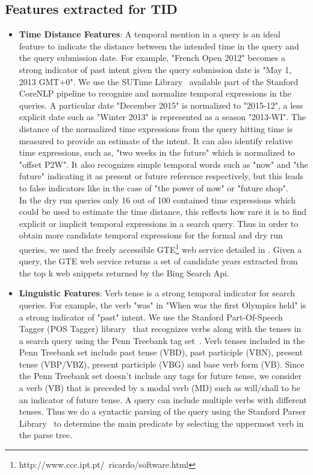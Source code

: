 \documentclass{sig-alternate}
\begin{document}
\subsection{Features extracted for TID}
\begin{itemize}
\item \textbf{Time Distance Features}: A temporal mention in a query is an ideal feature to indicate the distance between the intended time in the query and the query submission date. For example, "French Open 2012" becomes a strong indicator of past intent given the query submission date is "May 1, 2013 GMT+0". We use the SUTime Library~\cite{sutime} available part of the Stanford CoreNLP pipeline to recognize and normalize temporal expressions in the queries. A particular date "December 2015" is normalized to "2015-12", a less explicit date such as "Winter 2013" is represented as a season "2013-WI". The distance of the normalized time expressions from the query hitting time is measured to provide an estimate of the intent. It can also identify relative time expressions, such as, "two weeks in the future" which is normalized to "offset P2W". It also recognizes simple temporal words such as "now" and "the future" indicating it as present or future reference respectively, but this leads to false indicators like in the case of "the power of now" or "future shop". 
\\
In the dry run queries only 16 out of 100 contained time expressions which could be used to estimate the time distance, this reflects how rare it is to find explicit or implicit temporal expressions in a search query. Thus in order to obtain more candidate temporal expressions for the formal and dry run queries, we used the freely accessible GTE\footnote{http://www.ccc.ipt.pt/~ricardo/software.html} web service detailed in \cite{gte}. Given a query, the GTE web service returns a set of candidate years extracted from the top k web snippets returned by the Bing Search Api.  
\item \textbf{Linguistic Features}:
Verb tense is a strong temporal indicator for search queries. For example, the verb "was" in "When was the first Olympics held" is a strong indicator of "past" intent. We use the Stanford Part-Of-Speech Tagger (POS Tagger) library~\cite{postagger} that recognizes verbs along with the tenses in a search query using the Penn Treebank tag set~\cite{penn}. Verb tenses included in the Penn Treebank set include past tense (VBD), past participle (VBN), present tense (VBP/VBZ), present participle (VBG) and base verb form (VB). Since the Penn Treebank set doesn't include any tags for future tense, we consider a verb (VB) that is preceded by a modal verb (MD) such as will/shall to be an indicator of future tense. A query can include multiple verbs with different tenses. Thus we do a syntactic parsing of the query using the Stanford Parser Library~\cite{parser} to determine the main predicate by selecting the uppermost verb in the parse tree. 

\end{itemize}
\end{document}
